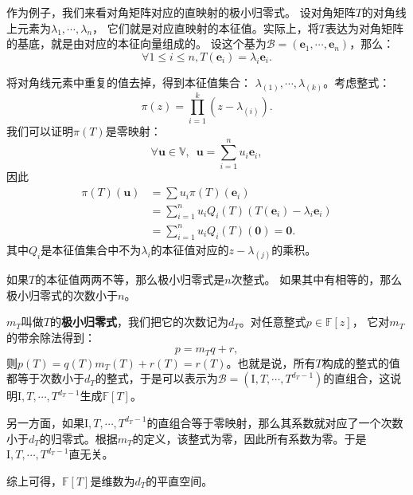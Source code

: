 \documentclass[12pt,UTF8]{ctexbook}
\begin{document}
作为例子，我们来看对角矩阵对应的直映射的极小归零式。
设对角矩阵$T$的对角线上元素为$\lambda_1, \cdots , \lambda_n$，
它们就是对应直映射的本征值。实际上，将$T$表达为对角矩阵的基底，就是由对应的本征向量组成的。
设这个基为$\mathcal{B} = (\mathbf{e}_1, \cdots, \mathbf{e}_n)$，那么：
$$ \forall 1 \leqslant i \leqslant n, T(\mathbf{e}_i) = \lambda_i \mathbf{e}_i. $$

将对角线元素中重复的值去掉，得到本征值集合：
$\lambda_{(1)}, \cdots , \lambda_{(k)}$。考虑整式：
$$ \pi(z) = \prod_{i=1}^k (z - \lambda_{(i)}).$$
我们可以证明$\pi(T)$是零映射：
$$ \forall \mathbf{u} \in \mathbb{V}, \,\,\, \mathbf{u} = \sum_{i=1}^n u_i \mathbf{e}_i, $$
因此
\begin{align*}
     \pi(T)(\mathbf{u}) &= \sum u_i \pi(T) (\mathbf{e}_i)  \\
     &= \sum_{i=1}^n u_i Q_i(T) (T(\mathbf{e}_i) - \lambda_i \mathbf{e}_i)  \\
     &= \sum_{i=1}^n u_i Q_i(T) (\mathbf{0}) = \mathbf{0}.  
\end{align*}
其中$Q_i$是本征值集合中不为$\lambda_i$的本征值对应的$z - \lambda_{(j)}$的乘积。

如果$T$的本征值两两不等，那么极小归零式是$n$次整式。
如果其中有相等的，那么极小归零式的次数小于$n$。

$m_T$叫做$T$的\textbf{极小归零式}，我们把它的次数记为$d_T$。对任意整式$p\in\mathbb{F}[z]$，
它对$m_T$的带余除法得到：
$$p = m_T q + r,$$
则$p(T) = q(T)m_T(T) + r(T) = r(T)$。也就是说，所有$T$构成的整式的值都等于次数小于$d_T$的整式，于是可以表示为$\mathcal{B} = (\mathrm{I}, T, \cdots , T^{d_T - 1})$的直组合，这说明$\mathrm{I}, T, \cdots , T^{d_T - 1}$生成$\mathbb{F}[T]$。

另一方面，如果$\mathrm{I}, T, \cdots , T^{d_T - 1}$的直组合等于零映射，那么其系数就对应了一个次数小于$d_T$的归零式。根据$m_T$的定义，该整式为零，因此所有系数为零。于是$\mathrm{I}, T , \cdots , T^{d_T - 1}$直无关。

综上可得，$\mathbb{F}[T]$是维数为$d_T$的平直空间。
\end{document}
